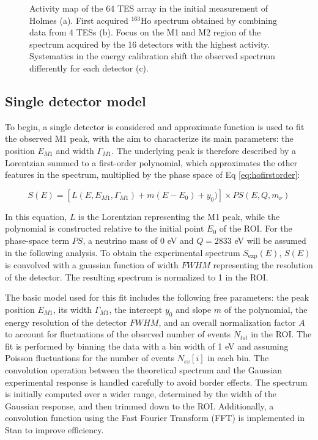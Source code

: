 \begin{figure}[t]
\begin{minipage}{\textwidth}
\begin{subfigure}[b]{\linewidth}
  \caption{} 
\end{subfigure}
\end{minipage}
\caption{Activity map of the 64 TES array in the initial measurement of Holmes (a). First acquired $^{163}$Ho spectrum obtained by
combining data from 4 TESs (b). Focus on the M1 and M2 region of the spectrum acquired by the 16 detectors with the
highest activity. Systematics in the energy calibration shift the observed spectrum differently for each detector (c).}
\label{fig:data}
\end{figure}


\subsection{Single detector model}
To begin, a single detector is considered and approximate function is used to fit the observed M1 peak, with the aim to
characterize its main parameters: the position $E_{M 1}$ and width $\Gamma_{M 1}$.
The underlying peak is therefore described by a Lorentzian summed to a first-order polynomial, which approximates the
other features in the spectrum, multiplied by the phase space of Eq \ref{eq:hofirstorder}:

\begin{equation}
  S(E)= [L(E, E_{M 1}, \Gamma_{M 1}) + m(E-E_0) + y_0)]\times PS(E, Q, m_\nu)
\end{equation}

In this equation, $L$ is the Lorentzian representing the M1 peak, while the polynomial is constructed relative to the initial point $E_0$ of the
ROI. For the phase-space term $PS$, a neutrino mass of 0 eV and  $Q=2833$ eV will be assumed in the following
analysis. To obtain the experimental spectrum $S_{\exp}(E)$, $S(E)$ is convolved with a gaussian function of width
$FWHM$ representing the resolution of the detector. The resulting spectrum is normalized to 1 in the ROI.

The basic model used for this fit includes the following free parameters: the peak position $E_{M1}$, its width $\Gamma_{M1}$, the
intercept $y_0$ and slope $m$ of the polynomial, the
energy resolution of the detector $FWHM$, and an overall normalization factor $A$ to account for fluctuations of the observed number of events $N_{tot}$ in the ROI. 
The fit is performed by binning the data with a bin width of 1 eV and assuming Poisson fluctuations for the number of
events $N_{ev}[i]$ in each bin. The convolution operation between the theoretical spectrum and the Gaussian experimental
response is handled carefully to avoid border effects. The spectrum is initially computed over a wider range, determined
by the width of the Gaussian response, and then trimmed down to the ROI. Additionally, a convolution function using the
Fast Fourier Transform (FFT) is implemented in Stan to improve efficiency.


